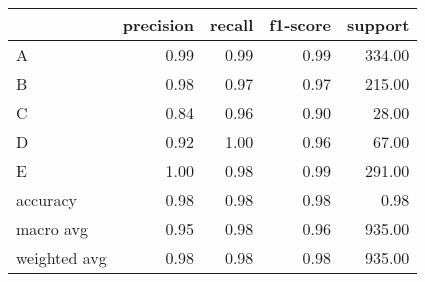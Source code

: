 \begin{tabular}{|l|r|r|r|r|}
\hline
{} &  precision &  recall &  f1-score &  support \\
\hline
A            &       0.99 &    0.99 &      0.99 &   334.00 \\
B            &       0.98 &    0.97 &      0.97 &   215.00 \\
C            &       0.84 &    0.96 &      0.90 &    28.00 \\
D            &       0.92 &    1.00 &      0.96 &    67.00 \\
E            &       1.00 &    0.98 &      0.99 &   291.00 \\
accuracy     &       0.98 &    0.98 &      0.98 &     0.98 \\
macro avg    &       0.95 &    0.98 &      0.96 &   935.00 \\
weighted avg &       0.98 &    0.98 &      0.98 &   935.00 \\
\hline
\end{tabular}
